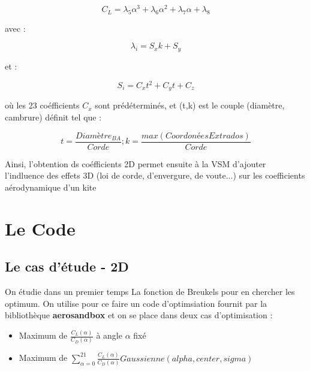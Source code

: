 \documentclass[conference]{IEEEtran}
\begin{document}
\begin{center}
    \begin{equation}
        C_L = \lambda_5  \alpha^3 +\lambda_6  \alpha^2 + \lambda_7  \alpha + \lambda_8
        \label{eq:Cl_breukels}
    \end{equation}
\end{center}
avec :
\begin{center}
    \begin{equation}
        \lambda_i = S_x  k + S_y
        \label{eq:lamba_breukels}
    \end{equation}
\end{center}
et :
\begin{center}
    \begin{equation}
        S_i = C_x  t^2 + C_y  t + C_z
        \label{eq:S_breukels}
    \end{equation}
\end{center}
où les 23 coéfficients $C_x$ sont prédéterminés, et (t,k) est le couple (diamètre, cambrure) définit tel que :
\begin{center}
    \begin{equation}
        t = \frac{Diamètre_{BA}}{Corde} ; k = \frac{max(CoordonéesExtrados)}{Corde}
        \label{eq:tk_breukels}
    \end{equation}
\end{center}

Ainsi, l'obtention ds coéfficients 2D permet ensuite à la VSM d'ajouter l'indluence des effets 3D (loi de corde, d'envergure, de voute...) sur les coefficients aérodynamique d'un kite

\IEEEpeerreviewmaketitle
\section{Le Code }

\subsection{Le cas d'étude - 2D} 

On étudie dans un premier temps La fonction de Breukels pour en chercher les optimum. On utilise pour ce faire un code d'optimsiation fournit par la bibliothèque \textbf{aerosandbox} et on se place dans deux cas d'optimisation : 
\begin{itemize}
    \item Maximum de $\frac{C_L(\alpha)}{C_D(\alpha)}$ à angle $\alpha$ fixé 
    \item Maximum de $\sum_{\alpha = 0}^{21}\frac{C_L(\alpha)}{C_D(\alpha)} Gaussienne(alpha, center, sigma) $
\end{itemize}
\end{document}
